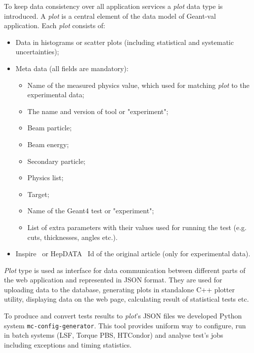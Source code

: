 To keep data consistency over all application services a \textit{plot} data type is introduced. A \textit{plot} is a central element of the data model of \textsf{Geant-val} application. Each \textit{plot} consists of:
\begin{itemize}
    \item Data in histograms or scatter plots (including statistical and systematic uncertainties);
    \item Meta data (all fields are mandatory):
    \begin{itemize}
        \item Name of the measured physics value, which used for matching \textit{plot} to the experimental data;
        \item The name and version of tool or "experiment";
        \item Beam particle;
        \item Beam energy;
        \item Secondary particle;
        \item Physics list;
        \item Target;
        \item Name of the Geant4 test or "experiment";
        \item List of extra parameters with their values used for running the test (e.g. cuts, thicknesses, angles etc.).
    \end{itemize}
    \item Inspire~\cite{inspire} or HepDATA~\cite{hepdata} Id of the original article (only for experimental data).
\end{itemize}

\textit{Plot} type is used as interface for data communication between different parts of the web application and represented in JSON format. They are used for uploading data to the database, generating plots in standalone C++ plotter utility, displaying data on the web page, calculating result of statistical tests etc.

To produce and convert tests results to \textit{plot}'s JSON files we developed Python system {\tt mc-config-generator}. This tool provides uniform way to configure, run in batch systems (LSF, Torque PBS, HTCondor) and analyse test's jobs including exceptions and timing statistics. 